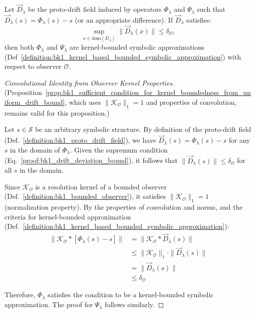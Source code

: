 \begin{proposition} 
\label{prop:bk1_sufficient_condition_for_kernel_boundedness_from_uniform_drift_bound}
Let $\vec{D}_\lambda$ be the proto-drift field induced by operators $\Phi_\lambda$ and $\Psi_\lambda$ such that $\vec{D}_\lambda(s) = \Phi_\lambda(s) - s$ (or an appropriate difference). If $\vec{D}_\lambda$ satisfies:
\begin{equation}
\sup_{x \in \mathrm{dom}(D_\lambda)} \|\vec{D}_\lambda(x)\| \leq \delta_\mathcal{O}, 
\end{equation}
then both $\Phi_\lambda$ and $\Psi_\lambda$ are kernel-bounded symbolic approximations (Def~\ref{definition:bk1_kernel_based_bounded_symbolic_approximation}) with respect to observer $\mathcal{O}$.
\begin{proof}[Convolutional Identity from Observer Kernel Properties]
\label{proof:bk1_observer_kernel_convolution}
(Proposition~\ref{prop:bk1_sufficient_condition_for_kernel_boundedness_from_uniform_drift_bound}, which uses $\|\mathcal{K}_\mathcal{O}\|_1 = 1$ and properties of convolution, remains valid for this proposition.)

Let $s \in \mathcal{S}$ be an arbitrary symbolic structure. By definition of the proto-drift field (Def.~\ref{definition:bk1_proto_drift_field}), we have $\vec{D}_\lambda(s) = \Phi_\lambda(s) - s$ for any $s$ in the domain of $\Phi_\lambda$. Given the supremum condition (Eq.~\ref{proof:bk1_drift_deviation_bound}), it follows that $\|\vec{D}_\lambda(s)\| \leq \delta_\mathcal{O}$ for all $s$ in the domain.

Since $\mathcal{K}_\mathcal{O}$ is a resolution kernel of a bounded observer (Def.~\ref{definition:bk1_bounded_observer}), it satisfies $\|\mathcal{K}_\mathcal{O}\|_1 = 1$ (normalization property). By the properties of convolution and norms, and the criteria for kernel-bounded approximation (Def.~\ref{definition:bk1_kernel_based_bounded_symbolic_approximation}):
\begin{align}
\|\mathcal{K}_\mathcal{O} \ast [\Phi_\lambda(s) - s]\| &= \|\mathcal{K}_\mathcal{O} \ast \vec{D}_\lambda(s)\| \\
&\leq \|\mathcal{K}_\mathcal{O}\|_1 \cdot \|\vec{D}_\lambda(s)\| \\
&= \|\vec{D}_\lambda(s)\| \\
&\leq \delta_\mathcal{O}
\end{align}

Therefore, $\Phi_\lambda$ satisfies the condition to be a kernel-bounded symbolic approximation. The proof for $\Psi_\lambda$ follows similarly.
\end{proof}
\end{proposition}
